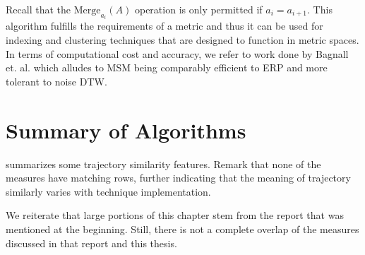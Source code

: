 Recall that the $\text{Merge}_{a_i}(A)$ operation is only permitted if $a_i = a_{i+1} $. 
This algorithm fulfills the requirements of a metric and thus it can be used for indexing and clustering techniques that are designed to function in metric spaces. 
In terms of computational cost and accuracy, we refer to work done by Bagnall et. al. which alludes to MSM being comparably efficient to ERP and more tolerant to noise DTW\cite{56-GreatTime}.

 

 
 \clearpage
\section{Summary of Algorithms}

 summarizes some trajectory similarity features. 
Remark that none of the measures have matching rows, further indicating that the meaning of trajectory similarly varies with technique implementation. 


We reiterate that large portions of this chapter stem from the report that was mentioned at the beginning. 
Still, there is not a complete overlap of the measures discussed in that report and this thesis. 






\begin{table}[t]
\centering
\caption{Quick view of some aspects the similarity distance measures}
\label{tab:meas_comp}
\end{table}


